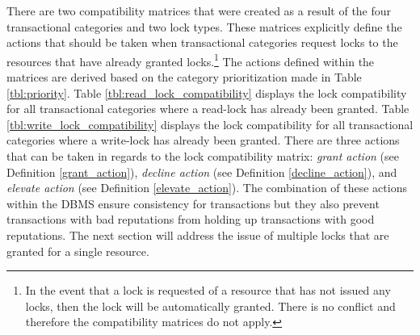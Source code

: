 \documentclass[conference]{IEEEtran}
\begin{document}
There are two compatibility matrices that were created as a result of the four transactional categories and two lock types. These matrices explicitly define the actions that should be taken when transactional categories request locks to the resources that have already granted locks.\footnote{In the event that a lock is requested of a resource that has not issued any locks, then the lock will be automatically granted. There is no conflict and therefore the compatibility matrices do not apply.} The actions defined within the matrices are derived based on the category prioritization made in Table \ref{tbl:priority}. Table \ref{tbl:read_lock_compatibility} displays the lock compatibility for all transactional categories where a read-lock has already been granted. Table \ref{tbl:write_lock_compatibility} displays the lock compatibility for all transactional categories where a write-lock has already been granted. There are three actions that can be taken in regards to the lock compatibility matrix: \textit{grant action} (see Definition \ref{grant_action}), \textit{decline action} (see Definition \ref{decline_action}), and \textit{elevate action} (see Definition \ref{elevate_action}). The combination of these actions within the DBMS ensure consistency for transactions but they also prevent transactions with bad reputations from holding up transactions with good reputations. The next section will address the issue of multiple locks that are granted for a single resource.
\end{document}
